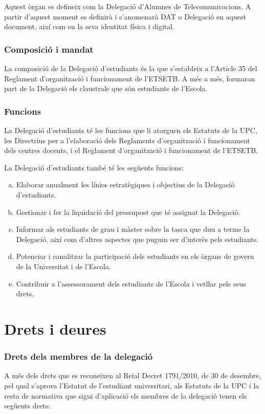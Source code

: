 \documentclass[a4paper,12pt]{article}
\begin{document}
Aquest òrgan es defineix com la Delegació d'Alumnes de Telecomunicacions. A partir d'aquest moment es definirà i s'anomenarà DAT o Delegació en aquest document, així com en la seva identitat física i digital.

\subsubsection{Composició i mandat}
La composició de la Delegació d'estudiants és la que s'estableix a l'Article 35 del Reglament d'organització i funcionament de l'ETSETB. A més a més, formaran part de la Delegació els claustrals que són estudiants de l'Escola.

\subsubsection{Funcions}\label{art:funcions}
La Delegació d'estudiants té les funcions que li atorguen els Estatuts de la UPC, les Directrius per a l'elaboració dels Reglaments d'organització i funcionament dels centres docents, i el Reglament d'organització i funcionament de l'ETSETB.

La Delegació d'estudiants també té les següents funcions:
\begin{enumerate}[a)]
	\item Elaborar anualment les línies estratègiques i objectius de la Delegació d'estudiants.
	\item Gestionar i fer la liquidació del pressupost que té assignat la Delegació.
	\item Informar als estudiants de grau i màster sobre la tasca que duu a terme la Delegació, així com d'altres aspectes que puguin ser d'interès pels estudiants.
	\item Potenciar i canalitzar la participació dels estudiants en els òrgans de govern de la Universitat i de l'Escola.
	\item Contribuir a l'assessorament dels estudiants de l'Escola i vetllar pels seus drets.
\end{enumerate}
\newpage

\section{Drets i deures}
\subsubsection{Drets dels membres de la delegació}
A més dels drets que es reconeixen al Reial Decret 1791/2010, de 30 de desembre, pel qual s'aprova l'Estatut de l'estudiant universitari, als Estatuts de la UPC i la resta de normativa que sigui d'aplicació els membres de la delegació tenen els següents drets:
\end{document}
